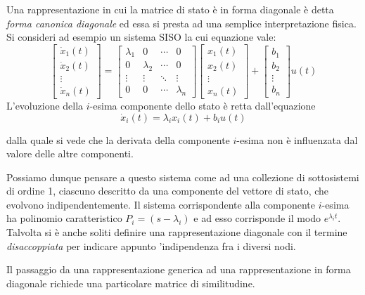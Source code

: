 \documentclass[a4paper]{article}
\theoremstyle{definition}
\begin{document}
			Una rappresentazione in cui la matrice di stato è in forma diagonale è detta \textit{forma canonica diagonale} ed essa si presta ad una semplice interpretazione fisica. Si consideri ad esempio un sistema SISO la cui equazione vale:
			\[
				\begin{bmatrix}
					\dot{x}_1 (t) \\
					\dot{x}_2 (t) \\
					\vdots \\
					\dot{x}_n (t)
				\end{bmatrix}
				=
				\begin{bmatrix}
					\lambda_1 & 0 & \cdots & 0 \\
					0 & \lambda_2 & \cdots & 0 \\
					\vdots & \vdots & \ddots & \vdots \\
					0 & 0 & \cdots & \lambda_n
				\end{bmatrix}
				\begin{bmatrix}
					x_1 (t) \\
					x_2 (t) \\
					\vdots \\
					x_n (t)
				\end{bmatrix}
				+
				\begin{bmatrix}
					b_1 \\
					b_2 \\
					\vdots\\
					b_n
				\end{bmatrix}
				u(t)
			\]
			L’evoluzione della $ i$-esima componente dello stato è retta dall’equazione
			\[
				\dot{x}_i(t) = \lambda_i x_i(t) + b_i u(t)
			\]
			
			dalla quale si vede che la derivata della componente $ i$-esima non è influenzata dal valore delle altre componenti.
			
			Possiamo dunque pensare a questo sistema come ad una collezione di sottosistemi di ordine 1, ciascuno descritto da una componente del vettore di stato, che evolvono indipendentemente. Il sistema corrispondente alla componente $ i$-esima ha polinomio caratteristico $ P_i = (s-\lambda_i) $ e ad esso corrisponde il modo $ e^{\lambda_i t} $. Talvolta si è anche soliti definire una rappresentazione diagonale con il termine \textit{disaccoppiata} per indicare appunto 'indipendenza fra i diversi nodi.
			
			Il passaggio da una rappresentazione generica ad una rappresentazione in forma
			diagonale richiede una particolare matrice di similitudine.
			
\end{document}
